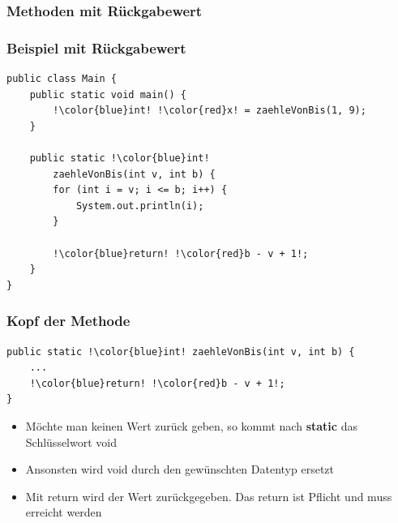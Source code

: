\documentclass[final]{beamer}
\begin{document}
\subsubsection{Methoden mit Rückgabewert}
\begin{frame}[containsverbatim]
	\frametitle{Beispiel mit Rückgabewert}
	\begin{lstlisting}[escapechar=!]
public class Main {
	public static void main() {
		!\color{blue}int! !\color{red}x! = zaehleVonBis(1, 9);
	}
	
	public static !\color{blue}int! 
		zaehleVonBis(int v, int b) {
		for (int i = v; i <= b; i++) {
			System.out.println(i);
		}
		
		!\color{blue}return! !\color{red}b - v + 1!;
	}
}
	\end{lstlisting}
\end{frame}

\begin{frame}[containsverbatim]
	\frametitle{Kopf der Methode}
	\begin{lstlisting}[escapechar=!]
public static !\color{blue}int! zaehleVonBis(int v, int b) {
	...
	!\color{blue}return! !\color{red}b - v + 1!;
}
	\end{lstlisting}
	\begin{itemize}
		\item{Möchte man keinen Wert zurück geben, so kommt nach \textbf{static} das Schlüsselwort \color{blue}void}
		\item{Ansonsten wird {\color{blue}void} durch den gewünschten Datentyp ersetzt}
		\item{Mit {\color{blue}return} wird der Wert zurückgegeben. Das {\color{blue}return} ist Pflicht und muss erreicht werden}
	\end{itemize}
\end{frame}
\end{document}
